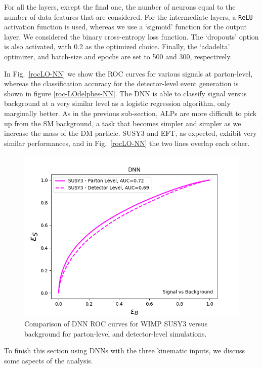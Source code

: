\documentclass[prd,aps,letterpaper,floatfix,superscriptaddress,preprintnumbers,twocolumn,10pt,nofootinbib]{revtex4-1}
\begin{document}
For all the layers, except the final one, the number of neurons equal to the number of data features that are considered. 
For the intermediate layers, a {\tt ReLU} activation function is used, whereas we use a `sigmoid' function  for the output layer. We considered the binary cross-entropy loss function. The `dropouts'  option is also activated, with 0.2 as the optimized choice. Finally, the `adadelta' optimizer, and  batch-size and epochs are set to 500 and 300, respectively. 

In Fig.~\ref{rocLO-NN}  we show the ROC curves for various signals at parton-level, whereas the classification accuracy for the detector-level event generation is shown in figure \ref{roc-LOdelphes-NN}. The DNN is able to classify signal versus background at a very similar level as a logistic regression algorithm, only marginally better. As in the previous sub-section, ALPs are more difficult to pick up from the SM background, a task that becomes simpler and simpler as we increase the mass of the DM particle. SUSY3 and EFT, as expected, exhibit very similar performances, and in Fig.~\ref{rocLO-NN} the two lines overlap each other. 
\begin{figure} %
\centering
\includegraphics[scale=0.50]{figures/ROCsbNNcomparePLandDelphes.png}
\caption{Comparison of DNN ROC curves  for WIMP SUSY3 versus background for parton-level and detector-level simulations.}\label{roc-LO-PL-delphes-NN}
\end{figure}

To finish this section using DNNs with the three kinematic inputs, we discuss some aspects of the analysis. 
\end{document}
